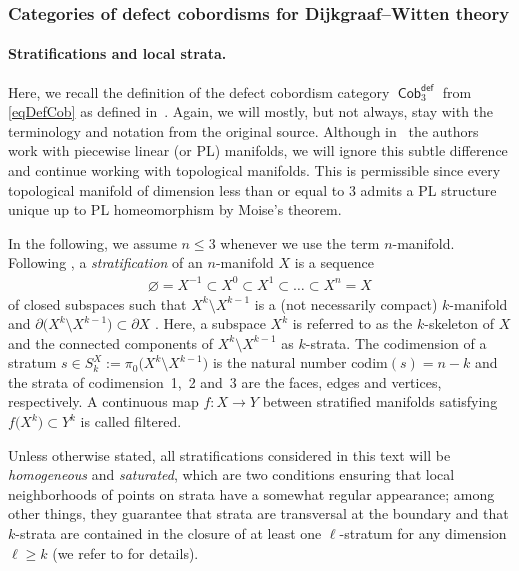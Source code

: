 \documentclass[10pt,a4paper]{amsart}
\DeclareMathOperator{\Cob}{\mathsf{Cob}}
\numberwithin{equation}{section}
\theoremstyle{definition}
\begin{document}
\subsubsection{Categories of defect cobordisms for Dijkgraaf--Witten theory}
\label{subSubSecDWCob}
\paragraph{Stratifications and local strata.}
Here, we recall the definition of the defect cobordism category $\Cob_3^{\mathsf{def}}$ from \eqref{eqDefCob} as defined in~\cite{FMM}. Again, we will mostly, but not always, stay with the terminology and notation from the original source. Although in~\cite{FMM} the authors work with piecewise linear (or PL) manifolds, we will ignore this subtle difference and continue working with topological manifolds. This is permissible since every topological manifold of dimension less than or equal to 3 admits a PL structure unique up to PL homeomorphism by Moise's theorem.

In the following, we assume $n \leq 3$ whenever we use the term $n$-manifold. Following \cite[Section~3.2]{FMM}, a \textit{stratification} of an $n$-manifold $X$ is a sequence
\begin{align*}
 \varnothing = X^{-1} \subset X^0 \subset X^1 \subset \dots \subset X^n = X
\end{align*}
of closed subspaces such that $X^k \setminus X^{k-1}$ is a (not necessarily compact) $k$-manifold and $ \partial \bigl(X^k \setminus X^{k-1}\bigr) \subset \partial X$ \cite[Definition~3.6]{FMM}. Here, a subspace $X^k$ is referred to as the $k$-skeleton of $X$ and the connected components of $X^k \setminus X^{k-1}$ as $k$-strata. The codimension of a stratum $s \in S_k^X := \pi_0\bigl(X^k \setminus X^{k-1}\bigr)$ is the natural number $\mathrm{codim}(s) = n-k$ and the strata of codimension~1,~2 and~3 are the faces, edges and vertices, respectively. A continuous map $f\colon X \rightarrow Y$ between stratified manifolds satisfying $f\bigl(X^k\bigr) \subset Y^k$ is called filtered.

Unless otherwise stated, all stratifications considered in this text will be \textit{homogeneous} and \textit{saturated}, which are two conditions ensuring that local neighborhoods of points on strata have a somewhat regular appearance; among other things, they guarantee that strata are transversal at the boundary and that $k$-strata are contained in the closure of at least one $\ell$-stratum for any dimension $\ell \geq k$ (we refer to \cite[Definition~3.7]{FMM} for details).
\end{document}

